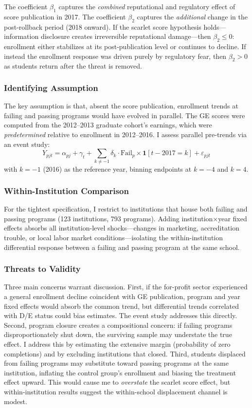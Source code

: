 \documentclass[12pt]{article}
\begin{document}
The coefficient $\beta_1$ captures the \textit{combined} reputational and regulatory effect of score publication in 2017. The coefficient $\beta_2$ captures the \textit{additional} change in the post-rollback period (2018 onward). If the scarlet score hypothesis holds---information disclosure creates irreversible reputational damage---then $\beta_2 \leq 0$: enrollment either stabilizes at its post-publication level or continues to decline. If instead the enrollment response was driven purely by regulatory fear, then $\beta_2 > 0$ as students return after the threat is removed.

\subsubsection*{Identifying Assumption} The key assumption is that, absent the score publication, enrollment trends at failing and passing programs would have evolved in parallel. The GE scores were computed from the 2012--2013 graduate cohort's earnings, which were \textit{predetermined} relative to enrollment in 2012--2016. I assess parallel pre-trends via an event study:
\begin{equation}
Y_{pjt} = \alpha_{pj} + \gamma_t + \sum_{k \neq -1} \delta_k \cdot \text{Fail}_p \times \mathbf{1}[t - 2017 = k] + \varepsilon_{pjt}
\end{equation}
with $k = -1$ (2016) as the reference year, binning endpoints at $k = -4$ and $k = 4$.

\subsubsection*{Within-Institution Comparison} For the tightest specification, I restrict to institutions that house both failing and passing programs (123 institutions, 793 programs). Adding institution$\times$year fixed effects absorbs all institution-level shocks---changes in marketing, accreditation trouble, or local labor market conditions---isolating the within-institution differential response between a failing and passing program at the same school.

\subsubsection*{Threats to Validity} Three main concerns warrant discussion. First, if the for-profit sector experienced a general enrollment decline coincident with GE publication, program and year fixed effects would absorb the common trend, but differential trends correlated with D/E status could bias estimates. The event study addresses this directly. Second, program closure creates a compositional concern: if failing programs disproportionately shut down, the surviving sample may understate the true effect. I address this by estimating the extensive margin (probability of zero completions) and by excluding institutions that closed. Third, students displaced from failing programs may substitute toward passing programs at the same institution, inflating the control group's enrollment and biasing the treatment effect upward. This would cause me to \textit{overstate} the scarlet score effect, but within-institution results suggest the within-school displacement channel is modest.
\end{document}
